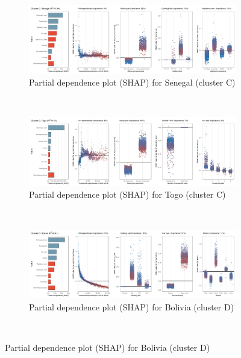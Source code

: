 \begin{figure}[ht!]\ContinuedFloat
    \centering
   \begin{subfigure}[b]{\textwidth}
    \centering
         \caption{Partial dependence plot (SHAP) for Senegal (cluster C)}
         \label{fig:5b_SEN}
         \includegraphics[width=\textwidth]{Figure 5b/Figure_5b_SEN}
         \end{subfigure}
    \\
    \vspace{0.5cm}
    \begin{subfigure}[b]{\textwidth}
   \centering
         \caption{Partial dependence plot (SHAP) for Togo (cluster C)}
         \label{fig:5b_TGO}
         \includegraphics[width=\textwidth]{Figure 5b/Figure_5b_TGO}    
         \end{subfigure}
    \\
    \vspace{0.5cm}
   \begin{subfigure}[b]{\textwidth}
   \centering
         \caption{Partial dependence plot (SHAP) for Bolivia (cluster D)}
         \label{fig:5b_BOL}
         \includegraphics[width=\textwidth]{Figure 5b/Figure_5b_BOL} 
    \end{subfigure}
    \\
    \vspace{0.5cm}
   

\end{figure}
